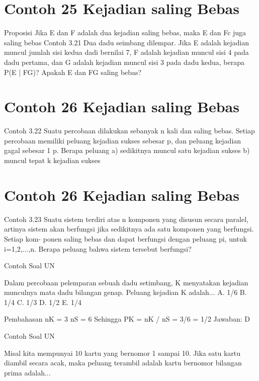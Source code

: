 \documentclass[11pt,fleqn]{book} %
\begin{document}
{{\section{Contoh 25 Kejadian saling Bebas}

Proposisi Jika E dan F adalah dua kejadian saling bebas, maka E dan Fc juga saling bebas
Contoh 3.21 Dua dadu seimbang dilempar. Jika E adalah kejadian muncul jumlah sisi kedua dadi bernilai 7, F adalah kejadian muncul sisi 4 pada dadu pertama, dan G adalah kejadian muncul sisi 3 pada dadu kedua, berapa P(E | FG)? Apakah E dan FG saling bebas?

\vspace{0.5in}
\section{Contoh 26 Kejadian saling Bebas}


Contoh 3.22 Suatu percobaan dilakukan sebanyak n kali dan saling bebas. Setiap percobaan memiliki peluang kejadian sukses sebesar p, dan peluang kejadian gagal sebesar 1 p. Berapa peluang
a) sedikitnya muncul satu kejadian sukses
b) muncul tepat k kejadian sukses

\vspace{0.5in}
\section{Contoh 26 Kejadian saling Bebas}
Contoh 3.23 Suatu sistem terdiri atas n komponen yang disusun secara paralel, artinya sistem akan berfungsi jika sedikitnya ada satu komponen yang berfungsi. Setiap kom- ponen saling bebas dan dapat berfungsi dengan peluang pi, untuk i=1,2,...,n. Berapa peluang bahwa sistem tersebut berfungsi?

\vspace{0.5in}
Contoh Soal UN

Dalam percobaan pelemparan sebuah dadu setimbang, K menyatakan kejadian munculnya mata dadu bilangan genap. Peluang kejadian K adalah...
A. 1/6
B. 1/4
C. 1/3
D. 1/2
E. 1/4

\vspace{0.5in}

Pembahasan
nK = 3
nS = 6
Sehingga PK = nK / nS = 3/6 = 1/2
Jawaban: D

\vspace{0.5in}

Contoh Soal UN

Misal kita mempunyai 10 kartu yang bernomor 1 sampai 10. Jika satu kartu diambil secara acak, maka peluang terambil adalah kartu bernomor bilangan prima adalah...

}}
\end{document}

